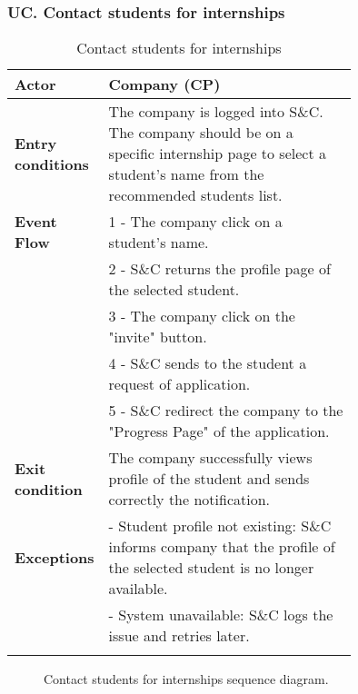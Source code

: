 \subsubsection*{UC\cuc . Contact students for internships}
\begin{center}
    \begin{longtable}{|l|p{0.75\linewidth}|}
        \hline
        \textbf{Actor}            & Company (CP)\\
        \hline
        \textbf{Entry conditions} & The company is logged into S\&C. The company should be on a specific internship page to select a student’s name from the recommended students list.\\
        \hline
        \textbf{Event Flow}     & 1 - The company click on a student's name. \\
                                & 2 - S\&C returns the profile page of the selected student. \\
                                & 3 - The company click on the "invite" button. \\
                                & 4 - S\&C sends to the student a request of application.\\
                                & 5 - S\&C redirect the company to the "Progress Page" of the application.\\
        \hline
        \textbf{Exit condition}     & The company successfully views profile of                                the student and sends correctly the notification.\\       
        \hline
        \textbf{Exceptions}     & - Student profile not existing: S\&C informs company that the profile of the selected student is no longer available. \\
                                & - System unavailable: S\&C logs the issue and retries later. \\
        \hline
        \caption{Contact students for internships}
        \label{tab: contact_students_for_internships_usecase}
    \end{longtable}
\end{center}

\begin{figure}[H]
    \begin{center}
        
        \caption{Contact students for internships sequence diagram.}
        \label{fig:contact_students_for_internships_seqd}%
    \end{center}
\end{figure}

